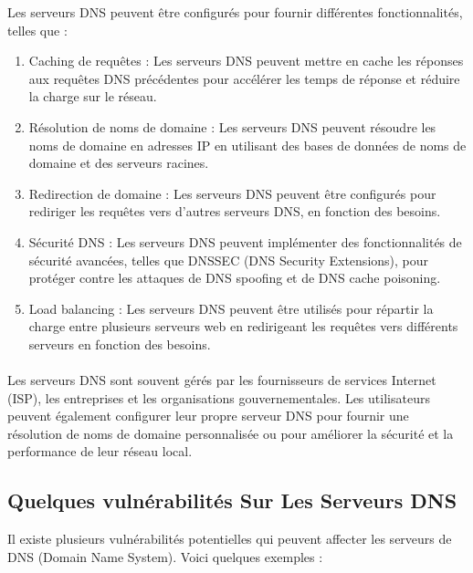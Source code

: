 Les serveurs DNS peuvent être configurés pour fournir différentes fonctionnalités, telles que :

 \begin{enumerate}
	
	\item     Caching de requêtes : Les serveurs DNS peuvent mettre en cache les réponses aux requêtes DNS précédentes pour accélérer les temps de réponse et réduire la charge sur le réseau.
	 
	\item Résolution de noms de domaine : Les serveurs DNS peuvent résoudre les noms de domaine en adresses IP en utilisant des bases de données de noms de domaine et des serveurs racines.
	 
	 \item Redirection de domaine : Les serveurs DNS peuvent être configurés pour rediriger les requêtes vers d'autres serveurs DNS, en fonction des besoins.
	 
	 \item Sécurité DNS : Les serveurs DNS peuvent implémenter des fonctionnalités de sécurité avancées, telles que DNSSEC (DNS Security Extensions), pour protéger contre les attaques de DNS spoofing et de DNS cache poisoning.
	 
	 \item Load balancing : Les serveurs DNS peuvent être utilisés pour répartir la charge entre plusieurs serveurs web en redirigeant les requêtes vers différents serveurs en fonction des besoins.
	 
\end{enumerate}
\paragraph{ }
Les serveurs DNS sont souvent gérés par les fournisseurs de services Internet (ISP), les entreprises et les organisations gouvernementales. Les utilisateurs peuvent également configurer leur propre serveur DNS pour fournir une résolution de noms de domaine personnalisée ou pour améliorer la sécurité et la performance de leur réseau local.
\subsection{Quelques vulnérabilités Sur Les Serveurs DNS }

Il existe plusieurs vulnérabilités potentielles qui peuvent affecter les serveurs de DNS (Domain Name System). Voici quelques exemples :\\

